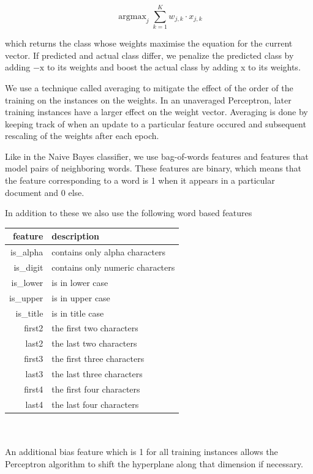 \documentclass[11pt]{article}
\DeclareMathOperator*{\argmax}{argmax}
\begin{document}
\begin{equation}
  \argmax_j \sum_{k=1}^K w_{j,k} \cdot x_{j,k}
\end{equation}

which returns the class whose weights maximise the equation for the current
vector.
If predicted and actual class differ, we penalize the predicted class by
adding $-\text{x}$ to its weights and boost the actual class by adding x to its weights.

We use a technique called averaging to mitigate the effect of the order of the
training on the instances on the weights.
In an unaveraged Perceptron, later training instances have a larger effect on
the weight vector.
Averaging is done by keeping track of when an update to a particular feature
occured and subsequent rescaling of the weights after each epoch.

Like in the Naive Bayes classifier, we use bag-of-words features and
features that model pairs of neighboring words.
These features are binary, which means that the feature corresponding to a word
is 1 when it appears in a particular document and 0 else.

In addition to these we also use the following word based features\\

\begin{tabular}{|r|l|}
  \hline
  feature & description\\\hline\hline
  is\_alpha & contains only alpha characters\\
  is\_digit & contains only numeric characters\\
  is\_lower & is in lower case\\
  is\_upper & is in upper case\\
  is\_title & is in title case\\
  first2 & the first two characters\\
  last2 & the last two characters\\
  first3 & the first three characters\\
  last3 & the last three characters\\
  first4 & the first four characters\\
  last4 & the last four characters\\\hline
\end{tabular}\\~\\

An additional bias feature which is 1 for all training instances allows the
Perceptron algorithm to shift the hyperplane along that dimension if necessary.
\end{document}
